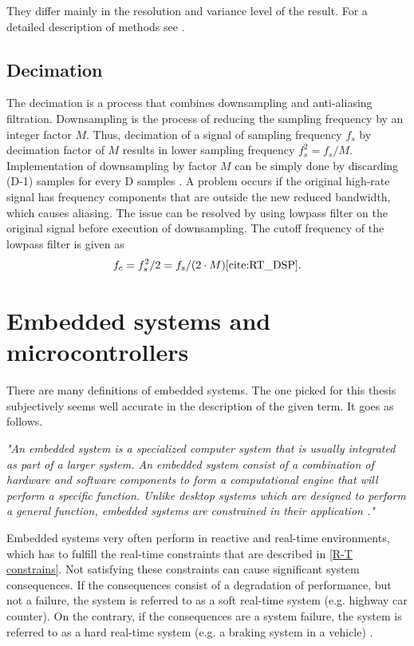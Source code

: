 \documentclass[twoside]{ctuthesis}
\theoremstyle{plain}
\theoremstyle{definition}
\theoremstyle{note}
\begin{document}
They differ mainly in the resolution and variance level of the result. For a detailed description of methods see \cite{cite:2}.

\subsection{Decimation}
\label{sec:decimation}
The decimation is a process that combines downsampling and anti-aliasing filtration. Downsampling is the process of reducing the sampling frequency by an integer factor $M$. Thus, decimation of a signal of sampling frequency $f_s$ by decimation factor of $M$ results in lower sampling frequency ${f_s^{2}=f_s/M}$. Implementation of downsampling by factor $M$ can be simply done by discarding (D-1) samples for every D samples \cite{cite:2}. 
A problem occurs if the original high-rate signal has frequency components that are outside the new reduced bandwidth, which causes aliasing. The issue can be resolved by using lowpass filter on the original signal before execution of downsampling. The cutoff frequency of the lowpass filter is given as
\begin{equation} \label{eq:decimation}
	f_c=f_s^{2}/2=f_s/(2\cdot M) \cite{cite:RT_DSP}.
\end{equation}

\section{Embedded systems and microcontrollers}
There are many definitions of embedded systems. The one picked for this thesis subjectively seems well accurate in the description of the given term. It goes as follows.

\textit{"An embedded system is a specialized computer system that is usually integrated as part of a larger system. An embedded system consist of a combination of hardware and software components to form a computational engine that will perform a specific function. Unlike desktop systems which are designed to perform a general function, embedded systems are constrained in their application \cite{cite:SE_for_ES}."}

Embedded systems very often perform in reactive and real-time environments, which has to fulfill the real-time constraints that are described in \ref{R-T constrains}. Not satisfying these constraints can cause significant system consequences. If the consequences consist of a degradation of performance, but not a failure, the system is referred to as a soft real-time system (e.g. highway car counter). On the contrary, if the consequences are a system failure, the system is referred to as a hard real-time system (e.g. a braking system in a vehicle) \cite{cite:SE_for_ES}\cite{cite:RT_DSP}. 
\end{document}
